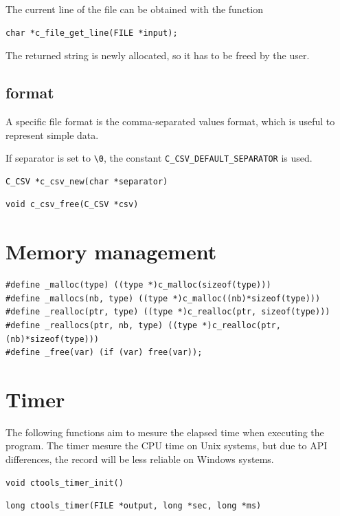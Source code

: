 The current line of the file can be obtained with the function
\begin{verbatim}
char *c_file_get_line(FILE *input);
\end{verbatim}
The returned string is newly allocated, so it has to be freed by the user.

\subsection{ format}

A specific file format is the comma-separated
values format, which is useful
to represent simple data.

If separator is set to \verb|\0|, the constant
\verb|C_CSV_DEFAULT_SEPARATOR| is used.
\begin{verbatim}
C_CSV *c_csv_new(char *separator)
\end{verbatim}
\begin{verbatim}
void c_csv_free(C_CSV *csv)
\end{verbatim}

\section{Memory management}

\begin{verbatim}
#define _malloc(type) ((type *)c_malloc(sizeof(type)))
#define _mallocs(nb, type) ((type *)c_malloc((nb)*sizeof(type)))
#define _realloc(ptr, type) ((type *)c_realloc(ptr, sizeof(type)))
#define _reallocs(ptr, nb, type) ((type *)c_realloc(ptr, (nb)*sizeof(type)))
#define _free(var) (if (var) free(var));
\end{verbatim}

\section{Timer}

The following functions aim to mesure the elapsed time when executing the program. The timer mesure the CPU time on Unix systems, but due to API differences, the record will be less reliable on Windows systems.
\begin{verbatim}
void ctools_timer_init()
\end{verbatim}

\begin{verbatim}
long ctools_timer(FILE *output, long *sec, long *ms)
\end{verbatim}
